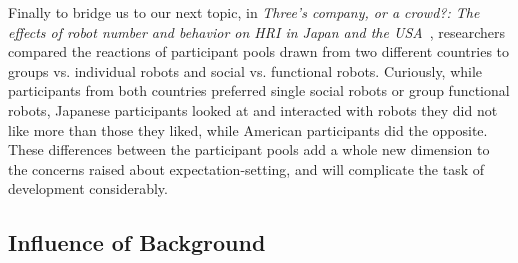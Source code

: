 \documentclass{sfuthesis}
\begin{document}
Finally to bridge us to our next topic, in \textit{Three's company, or a crowd?: The effects of robot number and behavior on HRI in Japan and the USA}~\cite{fraune2015three}, researchers compared the reactions of participant pools drawn from two different countries to groups vs. individual robots and social vs. functional robots. Curiously, while participants from both countries preferred single social robots or group functional robots, Japanese participants looked at and interacted with robots they did not like more than those they liked, while American participants did the opposite. These differences between the participant pools add a whole new dimension to the concerns raised about expectation-setting, and will complicate the task of development considerably.








\subsection{Influence of Background}
\end{document}
